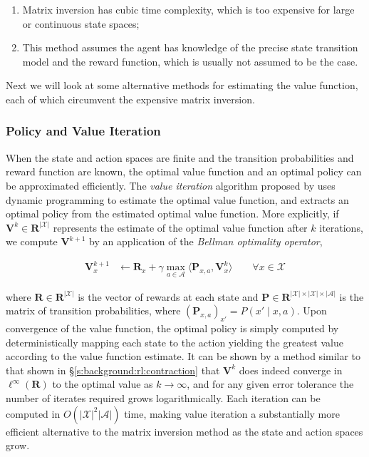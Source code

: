 \begin{enumerate}
\item Matrix inversion has cubic time complexity, which is too
  expensive for large or continuous state spaces;
\item This method assumes the agent has knowledge of the precise
  state transition model and the reward function, which is usually not
  assumed to be the case.
\end{enumerate}

Next we will look at some alternative methods for estimating the value
function, each of which circumvent the expensive matrix inversion.

\subsubsection{Policy and Value Iteration}
When the state and action spaces are finite and the transition
probabilities and reward function are known, the optimal value function and an
optimal policy can be approximated efficiently. The \emph{value iteration}
algorithm proposed by \citet{bellman1954theory} uses dynamic programming
\citep{bellman1954theory} to estimate the optimal value function, and extracts an
optimal policy from the estimated optimal value function. More explicitly, if
$\pmb{V}^k\in\mathbf{R}^{|\mathcal{X}|}$ represents the estimate of the optimal value
function after $k$ iterations, we compute $\pmb{V}^{k+1}$ by an application of
the \emph{Bellman optimality operator},

\begin{align*}
  \pmb{V}^{k+1}_x &\leftarrow \pmb{R}_x +
  \gamma\max_{a\in\mathcal{A}}\langle \pmb{P}_{x,a},
  \pmb{V}^k_x\rangle\qquad\forall x\in\mathcal{X}
\end{align*}

where $\pmb{R}\in\mathbf{R}^{|\mathcal{X}|}$ is the vector of rewards at each
state and
$\pmb{P}\in\mathbf{R}^{|\mathcal{X}|\times|\mathcal{X}|\times|\mathcal{A}|}$ is
the matrix of transition probabilities, where $(\pmb{P}_{x,a})_{x'} = P(x'\mid
x, a)$. Upon convergence of the value function, the optimal policy is simply
computed by deterministically mapping each state to the action yielding the
greatest value according to the value function estimate.
It can be shown by a method similar to that shown in
\S\ref{s:background:rl:contraction} that $\pmb{V}^k$ does indeed converge in
$\ell^\infty(\mathbf{R})$ to the optimal value as $k\to\infty$, and for any
given error tolerance the number of iterates required grows logarithmically.
Each iteration can be computed in $O(|\mathcal{X}|^2|\mathcal{A}|)$ time, making
value iteration a substantially more efficient alternative to the matrix
inversion method as the state and action spaces grow.

